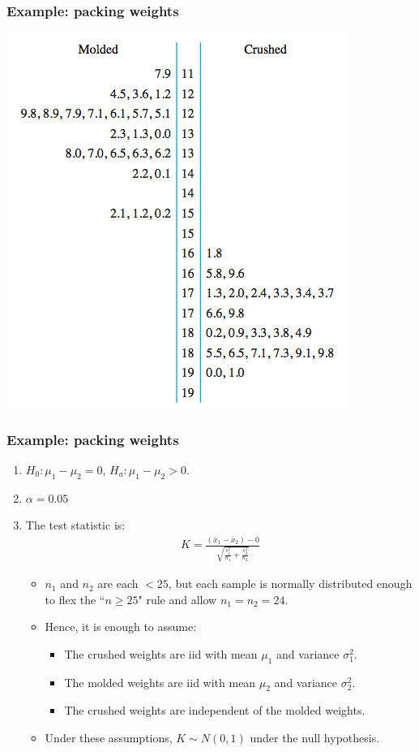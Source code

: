 \documentclass[handout]{beamer}\usepackage{graphicx, color}
\providecommand{\ov}[1]{\overline{#1}}
\numberwithin{equation}{section}
\begin{document}
\begin{frame}
\frametitle{Example: packing weights}
\begin{center}
 \includegraphics{../../fig/solidsstem.png}
\end{center}
\end{frame}

\begin{frame}
\frametitle{Example: packing weights}
\begin{enumerate}[1. ]
\item $H_0:  \mu_1 - \mu_2 = 0$, $H_a: \mu_1 - \mu_2 > 0$.
\pause \item $\alpha = 0.05$
\pause \item The test statistic is:
\pause \begin{align*}
K = \frac{(\ov{x}_1 - \ov{x}_2) - 0}{\sqrt{\frac{s^2_1}{n_1} + \frac{s^2_2}{n_2}}}
\end{align*}
\begin{itemize}
\pause \item $n_1$ and $n_2$ are each $< 25$, but each sample is normally distributed enough to flex the ``$n \ge 25$" rule and allow $n_1 = n_2 = 24$.
\pause \item Hence, it is enough to assume:
\begin{itemize}
\pause \item The crushed weights are iid with mean $\mu_1$ and variance $\sigma^2_1$.
\pause \item The molded weights are iid  with mean $\mu_2$ and variance $\sigma^2_2$.
\pause \item The crushed weights are independent of the molded weights.
\end{itemize}
\pause \item Under these assumptions, $K \sim N(0,1)$ under the null hypothesis.
\end{itemize}
\setcounter{saveenum}{\value{enumi}}

\end{enumerate}
\end{frame}
\end{document}
